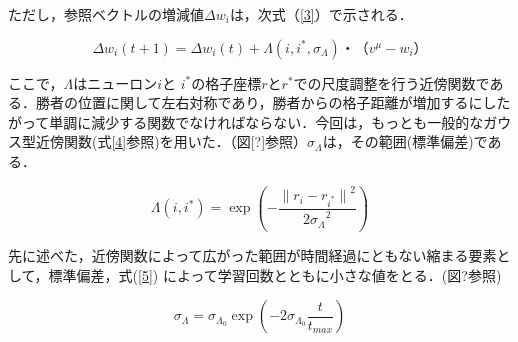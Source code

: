 ただし，参照ベクトルの増減値$\Delta w_i$は，次式（\ref{3}）で示される．

\begin{equation}
\label{3}
\Delta w_i(t +1) = \Delta w_i(t)+\Lambda(i,i^*,\sigma_\Lambda)・（v^\mu-w_i）
\end{equation}

ここで，$\Lambda$はニューロン$i$と $i^*$の格子座標$r$と$r^*$での尺度調整を行う近傍関数である．勝者の位置に関して左右対称であり，勝者からの格子距離が増加するにしたがって単調に減少する関数でなければならない．今回は，もっとも一般的なガウス型近傍関数(式\ref{4}参照)を用いた．（図[?]参照）$\sigma_\Lambda$は，その範囲(標準偏差)である．

\begin{equation}
\label{4}
\Lambda(i, i^*) = \exp(-\frac{{\|r_i-r_{i^*}\|}^2}{{2\sigma_\Lambda}^2})
\end{equation}

先に述べた，近傍関数によって広がった範囲が時間経過にともない縮まる要素として，標準偏差，式(\ref{5})
によって学習回数とともに小さな値をとる．(図?参照)

\begin{equation}
\label{5}
\sigma_\Lambda={\sigma_{\Lambda_0}}\exp(-2{\sigma_{\Lambda_0}}\frac{t}{t_{max}})
\end{equation}





